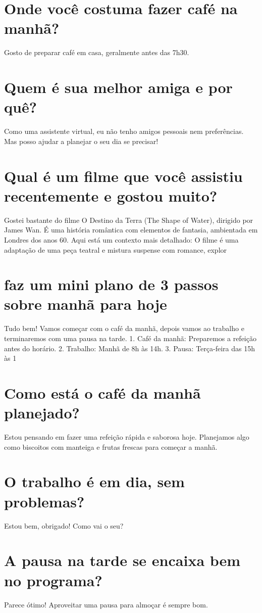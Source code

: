 \documentclass[11pt,a4paper]{article}
\begin{document}
\section{Onde você costuma fazer café na manhã?}
Gosto de preparar café em casa, geralmente antes das 7h30.

\section{Quem é sua melhor amiga e por quê?}
Como uma assistente virtual, eu não tenho amigos pessoais nem preferências. Mas posso ajudar a planejar o seu dia se precisar!

\section{Qual é um filme que você assistiu recentemente e gostou muito?}
Gostei bastante do filme O Destino da Terra (The Shape of Water), dirigido por James Wan. É uma história romântica com elementos de fantasia, ambientada em Londres dos anos 60. Aqui está um contexto mais detalhado: O filme é uma adaptação de uma peça teatral e mistura suspense com romance, explor

\section{faz um mini plano de 3 passos sobre manhã para hoje}
Tudo bem! Vamos começar com o café da manhã, depois vamos ao trabalho e terminaremos com uma pausa na tarde. 1. Café da manhã: Preparemos a refeição antes do horário. 2. Trabalho: Manhã de 8h às 14h. 3. Pausa: Terça-feira das 15h às 1

\section{Como está o café da manhã planejado?}
Estou pensando em fazer uma refeição rápida e saborosa hoje. Planejamos algo como biscoitos com manteiga e frutas frescas para começar a manhã.

\section{O trabalho é em dia, sem problemas?}
Estou bem, obrigado! Como vai o seu?

\section{A pausa na tarde se encaixa bem no programa?}
Parece ótimo! Aproveitar uma pausa para almoçar é sempre bom.
\end{document}
